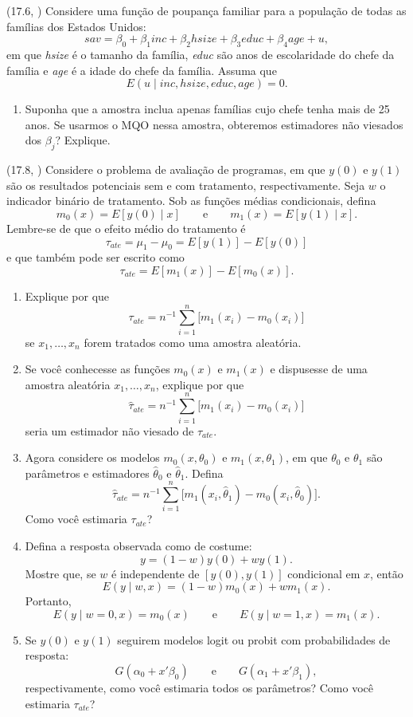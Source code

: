 \documentclass[12pt,letterpaper,onecolumn]{exam}
\begin{document}
\begin{questions}
\vspace{0.7cm}

\question\qstar (17.6, \citep{wooldridge2016}) Considere uma função de poupança familiar para a população de todas as famílias dos Estados Unidos:
\[
sav = \beta_0 + \beta_1 inc + \beta_2 hsize + \beta_3 educ + \beta_4 age + u,
\]
em que \textit{hsize} é o tamanho da família, \textit{educ} são anos de escolaridade do chefe da família e \textit{age} é a idade do chefe da família. Assuma que
\[
E(u \mid inc,hsize,educ,age)=0.
\]
\begin{enumerate}[label=(\roman*)]
    \item Suponha que a amostra inclua apenas famílias cujo chefe tenha mais de 25 anos. Se usarmos o MQO nessa amostra, obteremos estimadores não viesados dos \(\beta_j\)? Explique.
\end{enumerate}

\vspace{0.7cm}

\question\qstar (17.8, \citep{wooldridge2016}) Considere o problema de avaliação de programas, em que \(y(0)\) e \(y(1)\) são os resultados potenciais sem e com tratamento, respectivamente. Seja \(w\) o indicador binário de tratamento. Sob as funções médias condicionais, defina
\[
m_0(x)=E[y(0)\mid x]
\qquad \text{e} \qquad
m_1(x)=E[y(1)\mid x].
\]
Lembre-se de que o efeito médio do tratamento é
\[
\tau_{ate}=\mu_1-\mu_0=E[y(1)]-E[y(0)]
\]
e que também pode ser escrito como
\[
\tau_{ate}=E[m_1(x)]-E[m_0(x)].
\]
\begin{enumerate}[label=(\roman*)]
    \item Explique por que
    \[
    \tau_{ate}=n^{-1}\sum_{i=1}^{n}\big[m_1(x_i)-m_0(x_i)\big]
    \]
    se \(x_1,\ldots,x_n\) forem tratados como uma amostra aleatória.
    \item Se você conhecesse as funções \(m_0(x)\) e \(m_1(x)\) e dispusesse de uma amostra aleatória \(x_1,\ldots,x_n\), explique por que
    \[
    \hat{\tau}_{ate}=n^{-1}\sum_{i=1}^{n}\big[m_1(x_i)-m_0(x_i)\big]
    \]
    seria um estimador não viesado de \(\tau_{ate}\).
    \item Agora considere os modelos \(m_0(x,\theta_0)\) e \(m_1(x,\theta_1)\), em que \(\theta_0\) e \(\theta_1\) são parâmetros e estimadores \(\hat{\theta}_0\) e \(\hat{\theta}_1\). Defina
    \[
    \hat{\tau}_{ate}=n^{-1}\sum_{i=1}^{n}\big[m_1(x_i,\hat{\theta}_1)-m_0(x_i,\hat{\theta}_0)\big].
    \]
    Como você estimaria \(\tau_{ate}\)?
    \item Defina a resposta observada como de costume:
    \[
    y=(1-w)y(0)+wy(1).
    \]
    Mostre que, se \(w\) é independente de \([y(0),y(1)]\) condicional em \(x\), então
    \[
    E(y\mid w,x)=(1-w)m_0(x)+wm_1(x).
    \]
    Portanto,
    \[
    E(y\mid w=0,x)=m_0(x)
    \qquad \text{e} \qquad
    E(y\mid w=1,x)=m_1(x).
    \]
    \item Se \(y(0)\) e \(y(1)\) seguirem modelos logit ou probit com probabilidades de resposta:
    \[
    G(\alpha_0+x'\beta_0)
    \qquad \text{e} \qquad
    G(\alpha_1+x'\beta_1),
    \]
    respectivamente, como você estimaria todos os parâmetros? Como você estimaria \(\tau_{ate}\)?
\end{enumerate}


\end{questions}
\end{document}
